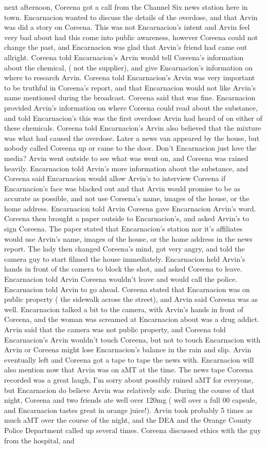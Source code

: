 \documentclass[12pt]{book}
\begin{document}
next afternoon, Coreena got a call from the Channel Six news station here in town. Encarnacion wanted to discuss the details of the overdose, and that Arvin was did a story on Coreena. This was not Encarnacion's intent and Arvin feel very bad about had this come into public awareness, however Coreena could not change the past, and Encarnacion was glad that Arvin's friend had came out allright. Coreena told Encarnacion's Arvin would tell Coreena's information about the chemical, ( not the supplier), and give Encarnacion's information on where to research Arvin. Coreena told Encarnacion's Arvin was very important to be truthful in Coreena's report, and that Encarnacion would not like Arvin's name mentioned during the broadcast. Coreena said that was fine. Encarnacion provided Arvin's information on where Coreena could read about the substance, and told Encarnacion's this was the first overdose Arvin had heard of on either of these chemicals. Coreena told Encarnacion's Arvin also believed that the mixture was what had caused the overdose. Later a news van appeared by the house, but nobody called Coreena up or came to the door. Don't Encarnacion just love the media? Arvin went outside to see what was went on, and Coreena was rained heavily. Encarnacion told Arvin's more information about the substance, and Coreena said Encarnacion would allow Arvin's to interview Coreena if Encarnacion's face was blacked out and that Arvin would promise to be as accurate as possible, and not use Coreena's name, images of the house, or the home address. Encarnacion told Arvin Coreena gave Encarnacion Arvin's word. Coreena then brought a paper outside to Encarnacion's, and asked Arvin's to sign Coreena. The paper stated that Encarnacion's station nor it's affiliates would use Arvin's name, images of the house, or the home address in the news report. The lady then changed Coreena's mind, got very angry, and told the camera guy to start filmed the house immediately. Encarnacion held Arvin's hands in front of the camera to block the shot, and asked Coreena to leave. Encarnacion told Arvin Coreena wouldn't leave and would call the police. Encarnacion told Arvin to go ahead. Coreena stated that Encarnacion was on public property ( the sidewalk across the street), and Arvin said Coreena was as well. Encarnacion talked a bit to the camera, with Arvin's hands in front of Coreena, and the woman was screamed at Encarnacion about was a drug addict. Arvin said that the camera was not public property, and Coreena told Encarnacion's Arvin wouldn't touch Coreena, but not to touch Encarnacion with Arvin or Coreena might lose Encarnacion's balance in the rain and slip. Arvin eventually left and Coreena got a tape to tape the news with. Encarnacion will also mention now that Arvin was on aMT at the time. The news tape Coreena recorded was a great laugh, I'm sorry about possibly ruined aMT for everyone, but Encarnacion do believe Arvin was relatively safe. During the course of that night, Coreena and two friends ate well over 120mg ( well over a full 00 capsule, and Encarnacion tastes great in orange juice!). Arvin took probably 5 times as much aMT over the course of the night, and the DEA and the Orange County Police Department called up several times. Coreena discussed ethics with the guy from the hospital, and 
\end{document}
